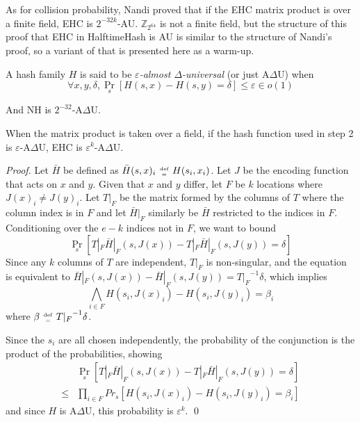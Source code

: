 \documentclass[runningheads]{llncs}
\newcommand{\ints}{\mathbb{Z}}
\newcommand{\defeq}{\;\genfrac{}{}{0pt}{2}{\text{def}}{=}\;}
\begin{document}



As for collision probability, Nandi proved that if the EHC matrix product is over a finite field, EHC is $2^{-32k}$-AU.
$\ints_{2^{64}}$ is not a finite field, but the structure of this proof that EHC in HalftimeHash is AU is similar to the structure of Nandi's proof, so a variant of that is presented here as a warm-up.  \cite{ehc-nandi}

\begin{definition}
  A hash family $H$ is said to be {\em $\varepsilon$-almost $\Delta$-universal} (or just A$\Delta$U) when
  \[
  \forall x,y,\delta, \Pr_s[H(s,x) - H(s,y) = \delta] \leq \varepsilon \in o(1)
  \]
\end{definition}

And NH is $2^{-32}$-A$\Delta$U. \cite{umac}


\begin{lemma}
  When the matrix product is taken over a field, if the hash function used in step 2 is $\varepsilon$-A$\Delta$U, EHC is $\varepsilon^k$-A$\Delta$U.
\end{lemma}
\begin{proof}
  Let $\bar{H}$ be defined as $\bar{H}(s, x)_i \defeq H(s_i, x_i)$.
  Let $J$ be the encoding function that acts on $x$ and $y$.
  Given that $x$ and $y$ differ, let $F$ be $k$ locations where $J(x)_i \neq J(y)_i$.
  Let $T|_F$ be the matrix formed by the columns of $T$ where the column index is in $F$ and let $\bar{H}|_F$ similarly be $\bar{H}$ restricted to the indices in $F$.
  Conditioning over the $e -k$ indices not in $F$, we want to bound
  \begin{equation}
    \label{ehc-delta}
    \Pr_s[T|_F \bar{H}|_F(s, J(x)) - T|_F \bar{H}|_F(s, J(y)) = \delta]
  \end{equation}
  Since any $k$ columns of $T$ are independent, $T|_F$ is non-singular, and the equation is equivalent to $\bar{H}|_F(s, J(x)) - \bar{H}|_F(s, J(y)) = {T|_F}^{-1} \delta$, which implies
  \[
  \bigwedge_{i \in F} H(s_i, J(x)_i) - H(s_i, J(y)_i) = \beta_i
  \]
  where $\beta \defeq {T|_F}^{-1} \delta$.

  Since the $s_i$ are all chosen independently, the probability of the conjunction is the product of the probabilities, showing
  \[
  \begin{array}{rl}
    &  \Pr_s[T|_F \bar{H}|_F (s,J(x)) - T|_F \bar{H}|_F(s,J(y)) = \delta] \\
  \leq &  \prod_{i \in F} Pr_s[H(s_i, J(x)_i) - H(s_i, J(y)_i) = \beta_i]
  \end{array}
  \]
  and since $H$ is A$\Delta$U, this probability is $\varepsilon^k$.  \qed
\end{proof}
\end{document}

